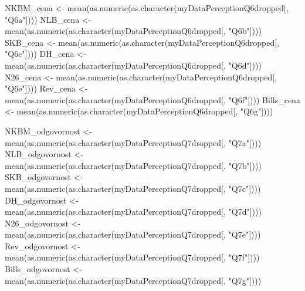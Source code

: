 \documentclass[
]{article}
\newenvironment{Shaded}{\begin{snugshade}}{\end{snugshade}}
\newcommand{\FunctionTok}[1]{\textcolor[rgb]{0.00,0.00,0.00}{#1}}
\newcommand{\NormalTok}[1]{#1}
\newcommand{\OtherTok}[1]{\textcolor[rgb]{0.56,0.35,0.01}{#1}}
\newcommand{\StringTok}[1]{\textcolor[rgb]{0.31,0.60,0.02}{#1}}
\begin{document}
\begin{Shaded}
\begin{Highlighting}[]
\NormalTok{NKBM\_cena }\OtherTok{\textless{}{-}} \FunctionTok{mean}\NormalTok{(}\FunctionTok{as.numeric}\NormalTok{(}\FunctionTok{as.character}\NormalTok{(myDataPerceptionQ6dropped[, }\StringTok{"Q6a"}\NormalTok{])))}
\NormalTok{NLB\_cena }\OtherTok{\textless{}{-}} \FunctionTok{mean}\NormalTok{(}\FunctionTok{as.numeric}\NormalTok{(}\FunctionTok{as.character}\NormalTok{(myDataPerceptionQ6dropped[, }\StringTok{"Q6b"}\NormalTok{])))}
\NormalTok{SKB\_cena }\OtherTok{\textless{}{-}} \FunctionTok{mean}\NormalTok{(}\FunctionTok{as.numeric}\NormalTok{(}\FunctionTok{as.character}\NormalTok{(myDataPerceptionQ6dropped[, }\StringTok{"Q6c"}\NormalTok{])))}
\NormalTok{DH\_cena }\OtherTok{\textless{}{-}} \FunctionTok{mean}\NormalTok{(}\FunctionTok{as.numeric}\NormalTok{(}\FunctionTok{as.character}\NormalTok{(myDataPerceptionQ6dropped[, }\StringTok{"Q6d"}\NormalTok{])))}
\NormalTok{N26\_cena }\OtherTok{\textless{}{-}} \FunctionTok{mean}\NormalTok{(}\FunctionTok{as.numeric}\NormalTok{(}\FunctionTok{as.character}\NormalTok{(myDataPerceptionQ6dropped[, }\StringTok{"Q6e"}\NormalTok{])))}
\NormalTok{Rev\_cena }\OtherTok{\textless{}{-}} \FunctionTok{mean}\NormalTok{(}\FunctionTok{as.numeric}\NormalTok{(}\FunctionTok{as.character}\NormalTok{(myDataPerceptionQ6dropped[, }\StringTok{"Q6f"}\NormalTok{])))}
\NormalTok{Bills\_cena }\OtherTok{\textless{}{-}} \FunctionTok{mean}\NormalTok{(}\FunctionTok{as.numeric}\NormalTok{(}\FunctionTok{as.character}\NormalTok{(myDataPerceptionQ6dropped[, }\StringTok{"Q6g"}\NormalTok{])))}

\NormalTok{NKBM\_odgovornost }\OtherTok{\textless{}{-}} \FunctionTok{mean}\NormalTok{(}\FunctionTok{as.numeric}\NormalTok{(}\FunctionTok{as.character}\NormalTok{(myDataPerceptionQ7dropped[, }\StringTok{"Q7a"}\NormalTok{])))}
\NormalTok{NLB\_odgovornost }\OtherTok{\textless{}{-}} \FunctionTok{mean}\NormalTok{(}\FunctionTok{as.numeric}\NormalTok{(}\FunctionTok{as.character}\NormalTok{(myDataPerceptionQ7dropped[, }\StringTok{"Q7b"}\NormalTok{])))}
\NormalTok{SKB\_odgovornost }\OtherTok{\textless{}{-}} \FunctionTok{mean}\NormalTok{(}\FunctionTok{as.numeric}\NormalTok{(}\FunctionTok{as.character}\NormalTok{(myDataPerceptionQ7dropped[, }\StringTok{"Q7c"}\NormalTok{])))}
\NormalTok{DH\_odgovornost }\OtherTok{\textless{}{-}} \FunctionTok{mean}\NormalTok{(}\FunctionTok{as.numeric}\NormalTok{(}\FunctionTok{as.character}\NormalTok{(myDataPerceptionQ7dropped[, }\StringTok{"Q7d"}\NormalTok{])))}
\NormalTok{N26\_odgovornost }\OtherTok{\textless{}{-}} \FunctionTok{mean}\NormalTok{(}\FunctionTok{as.numeric}\NormalTok{(}\FunctionTok{as.character}\NormalTok{(myDataPerceptionQ7dropped[, }\StringTok{"Q7e"}\NormalTok{])))}
\NormalTok{Rev\_odgovornost }\OtherTok{\textless{}{-}} \FunctionTok{mean}\NormalTok{(}\FunctionTok{as.numeric}\NormalTok{(}\FunctionTok{as.character}\NormalTok{(myDataPerceptionQ7dropped[, }\StringTok{"Q7f"}\NormalTok{])))}
\NormalTok{Bills\_odgovornost }\OtherTok{\textless{}{-}} \FunctionTok{mean}\NormalTok{(}\FunctionTok{as.numeric}\NormalTok{(}\FunctionTok{as.character}\NormalTok{(myDataPerceptionQ7dropped[, }\StringTok{"Q7g"}\NormalTok{])))}



\end{Highlighting}
\end{Shaded}
\end{document}
